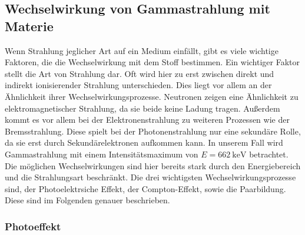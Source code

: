 \subsection{Wechselwirkung von Gammastrahlung mit Materie}
Wenn Strahlung jeglicher Art auf ein Medium einfällt, gibt es viele wichtige Faktoren, die die Wechselwirkung mit dem Stoff bestimmen. 
Ein wichtiger Faktor stellt die Art von Strahlung dar. Oft wird hier zu erst zwischen direkt und indirekt ionisierender Strahlung unterschieden. 
Dies liegt vor allem an der Ähnlichkeit ihrer Wechselwirkungsprozesse. Neutronen zeigen eine Ähnlichkeit zu elektromagnetischer Strahlung, da sie beide keine Ladung tragen. 
Außerdem kommt es vor allem bei der Elektronenstrahlung zu weiteren Prozessen wie der Bremsstrahlung. Diese spielt bei der Photonenstrahlung nur eine sekundäre Rolle, da sie erst durch Sekundärelektronen aufkommen kann. 
In unserem Fall wird Gammastrahlung mit einem Intensitätsmaximum von $E = \SI{662}{\kilo\electronvolt}$ betrachtet. 
Die möglichen Wechselwirkungen sind hier bereits stark durch den Energiebereich und die Strahlungsart beschränkt.
Die drei wichtigsten Wechselwirkungsprozesse sind, der Photoelektrsiche Effekt, der Compton-Effekt, sowie die Paarbildung. Diese sind im Folgenden genauer beschrieben.
\subsubsection{Photoeffekt}

